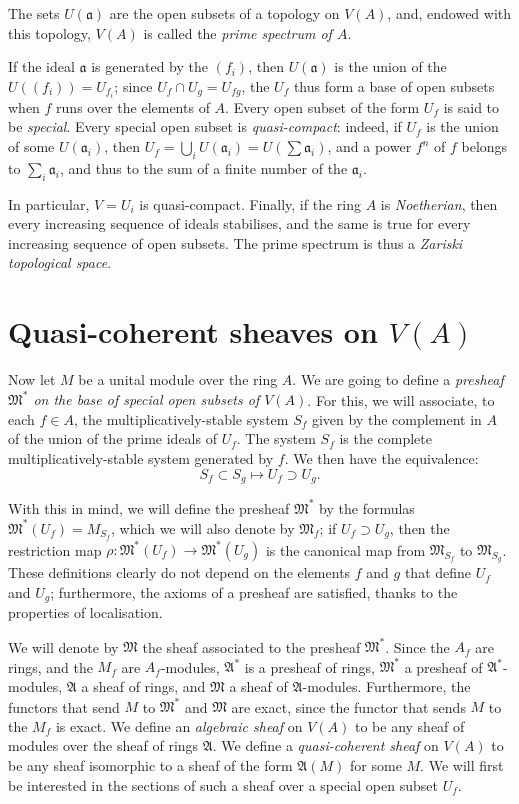 \documentclass{article}
\newcommand{\oldpage}[1]{\marginpar{\footnotesize$\Big\vert$ \textit{p.~#1}}}
\begin{document}
The sets $U(\mathfrak{a})$ are the open subsets of a topology on $V(A)$, and, endowed with this topology, $V(A)$ is called the \emph{prime spectrum of $A$}.

If the ideal $\mathfrak{a}$ is generated by the $(f_i)$, then $U(\mathfrak{a})$ is the union of the $U((f_i))=U_{f_i}$;
since $U_f\cap U_g=U_{fg}$, the $U_f$ thus form a base of open subsets when $f$ runs over the elements of $A$.
Every open subset of the form $U_f$ is said to be \emph{special}.
Every special open subset is \emph{quasi-compact}:
indeed, if $U_f$ is the union of some $U(\mathfrak{a}_i)$, then $U_f=\bigcup_i U(\mathfrak{a}_i)=U(\sum\mathfrak{a}_i)$, and a power $f^n$ of $f$ belongs to $\sum_i\mathfrak{a}_i$, and thus to the sum of a finite number of the $\mathfrak{a}_i$.

In particular, $V=U_i$ is quasi-compact.
Finally, if the ring $A$ is \emph{Noetherian}, then every increasing sequence of ideals stabilises, and the same is true for every
\oldpage{1-04}
increasing sequence of open subsets.
The prime spectrum is thus a \emph{Zariski topological space}.


\section{Quasi-coherent sheaves on \texorpdfstring{$V(A)$}{V(A)}}
\label{section3}

Now let $M$ be a unital module over the ring $A$.
We are going to define a \emph{presheaf $\mathfrak{M}^*$ on the base of special open subsets of $V(A)$}.
For this, we will associate, to each $f\in A$, the multiplicatively-stable system $S_f$ given by the complement in $A$ of the union of the prime ideals of $U_f$.
The system $S_f$ is the complete multiplicatively-stable system generated by $f$.
We then have the equivalence:
\[
  S_f \subset S_g \mapsto U_f \supset U_g.
\]

With this in mind, we will define the presheaf $\mathfrak{M}^*$ by the formulas $\mathfrak{M}^*(U_f)=M_{S_f}$, which we will also denote by $\mathfrak{M}_f$;
if $U_f\supset U_g$, then the restriction map $\rho\colon\mathfrak{M}^*(U_f)\to\mathfrak{M}^*(U_g)$ is the canonical map from $\mathfrak{M}_{S_f}$ to $\mathfrak{M}_{S_g}$.
These definitions clearly do not depend on the elements $f$ and $g$ that define $U_f$ and $U_g$;
furthermore, the axioms of a presheaf are satisfied, thanks to the properties of localisation.

We will denote by $\mathfrak{M}$ the sheaf associated to the presheaf $\mathfrak{M}^*$.
Since the $A_f$ are rings, and the $M_f$ are $A_f$-modules, $\mathfrak{A}^*$ is a presheaf of rings, $\mathfrak{M}^*$ a presheaf of $\mathfrak{A}^*$-modules, $\mathfrak{A}$ a sheaf of rings, and $\mathfrak{M}$ a sheaf of $\mathfrak{A}$-modules.
Furthermore, the functors that send $M$ to $\mathfrak{M}^*$ and $\mathfrak{M}$ are exact, since the functor that sends $M$ to the $M_f$ is exact.
We define an \emph{algebraic sheaf} on $V(A)$ to be any sheaf of modules over the sheaf of rings $\mathfrak{A}$.
We define a \emph{quasi-coherent sheaf} on $V(A)$ to be any sheaf isomorphic to a sheaf of the form $\mathfrak{A}(M)$ for some $M$.
We will first be interested in the sections of such a sheaf over a special open subset $U_f$.
\end{document}
